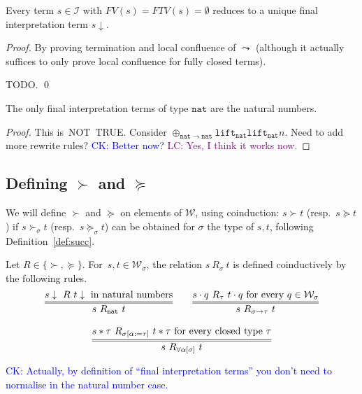 \documentclass[runningheads,a4paper]{llncs}
\newcommand{\Iterms}{\mathcal{I}}
\newcommand{\World}{\mathcal{W}}
\newcommand{\app}[2]{#1 \cdot #2}
\newcommand{\tapp}[2]{#1 * #2}
\newcommand{\subst}[2]{#1:=#2}
\newcommand{\FTV}{\mathit{FTV}}
\newcommand{\FV}{\mathit{FV}}
\newcommand{\nat}{\mathtt{nat}}
\newcommand{\lift}{\mathtt{lift}}
\newcommand{\da}{\downarrow}
\newcommand{\CK}[1]{\textcolor{blue}{CK: #1}}
\newcommand{\LC}[1]{\textcolor{purple}{LC: #1}}
\begin{document}
\begin{lemma}
Every term $s \in \Iterms$ with $\FV(s) = \FTV(s) = \emptyset$ reduces
to a unique final interpretation term $s\downarrow$.
\end{lemma}

\begin{proof}
By proving termination and local confluence of $\leadsto$ (although it
actually suffices to only prove local confluence for fully closed terms).

TODO.
\qed
\end{proof}

\begin{lemma}
The only final interpretation terms of type $\nat$ are the natural
numbers.
\end{lemma}

\begin{proof}
  This is~NOT~TRUE. Consider
  $\oplus_{\nat\to\nat} \lift_\nat \lift_\nat n$. Need to add more
  rewrite rules?
  \CK{Better now?} \LC{Yes, I think it works now.}
\end{proof}

\subsection{Defining $\succ$ and $\succeq$}

We will define $\succ$ and $\succeq$ on elements of $\World$, using
coinduction: $s \succ t$ (resp.\ $s \succeq t$) if $s \succ_\sigma t$
(resp.\ $s \succeq_\sigma t$) can be obtained for $\sigma$ the type of
$s,t$, following Definition~\ref{def:succ}.

\begin{definition}\label{def:succ}
  Let $R \in \{ \succ,\succeq \}$. For~$s,t \in \World_\sigma$, the
  relation $s\ R_{\sigma}\ t$ is defined coinductively by the
  following rules.
  \[
    \begin{array}{c}
    \infer={s\ R_\nat\ t}{s\da\ R\ t\da \text{ in natural
        numbers}}\quad\quad
    \infer={s\ R_{\sigma\to\tau}\ t}{\app{s}{q}\ R_{\tau}\ \app{t}{q}
      \text{ for every } q \in \World_\sigma} \\ \\
    \infer={s\ R_{\forall\alpha[\sigma]}\ t}{\tapp{s}{\tau}\ R_{\sigma[\subst{\alpha}{\tau}]}\ \tapp{t}{\tau}
      \text{ for every closed type } \tau}
    \end{array}
  \]
\end{definition}

\CK{Actually, by definition of ``final interpretation terms'' you
don't need to normalise in the natural number case.}
\end{document}
